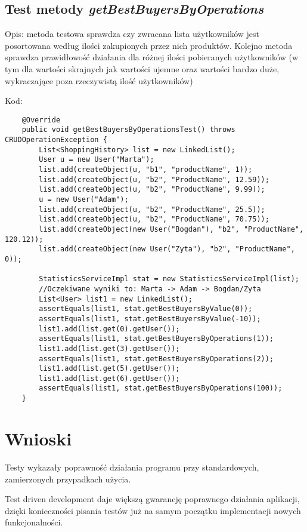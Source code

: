 \documentclass[a4paper,11pt,notitlepage]{article}
\begin{document}
\subsection{Test metody \textit{getBestBuyersByOperations}}

Opis: metoda testowa sprawdza czy zwracana lista użytkowników jest posortowana według ilości zakupionych przez nich produktów. Kolejno metoda sprawdza prawidłowość działania dla różnej ilości pobieranych użytkowników (w tym dla wartości skrajnych jak wartości ujemne oraz wartości bardzo duże, wykraczające poza rzeczywistą ilość użytkowników)

Kod:
\begin{footnotesize}\begin{verbatim}
	@Override
    public void getBestBuyersByOperationsTest() throws CRUDOperationException {
        List<ShoppingHistory> list = new LinkedList();
        User u = new User("Marta");
        list.add(createObject(u, "b1", "productName", 1));
        list.add(createObject(u, "b2", "ProductName", 12.59));
        list.add(createObject(u, "b2", "ProductName", 9.99));
        u = new User("Adam");
        list.add(createObject(u, "b2", "ProductName", 25.5));
        list.add(createObject(u, "b2", "ProductName", 70.75));
        list.add(createObject(new User("Bogdan"), "b2", "ProductName", 120.12));
        list.add(createObject(new User("Zyta"), "b2", "ProductName", 0));

        StatisticsServiceImpl stat = new StatisticsServiceImpl(list);
        //Oczekiwane wyniki to: Marta -> Adam -> Bogdan/Zyta
        List<User> list1 = new LinkedList();
        assertEquals(list1, stat.getBestBuyersByValue(0));
        assertEquals(list1, stat.getBestBuyersByValue(-10));
        list1.add(list.get(0).getUser());
        assertEquals(list1, stat.getBestBuyersByOperations(1));
        list1.add(list.get(3).getUser());
        assertEquals(list1, stat.getBestBuyersByOperations(2));
        list1.add(list.get(5).getUser());
        list1.add(list.get(6).getUser());
        assertEquals(list1, stat.getBestBuyersByOperations(100));
    }
\end{verbatim}\end{footnotesize}

\section{Wnioski}
Testy wykazały poprawność działania programu przy standardowych, zamierzonych przypadkach użycia.

Test driven development daje większą gwarancję poprawnego działania aplikacji, dzięki konieczności pisania testów już na samym początku implementacji nowych funkcjonalności.
\end{document}
